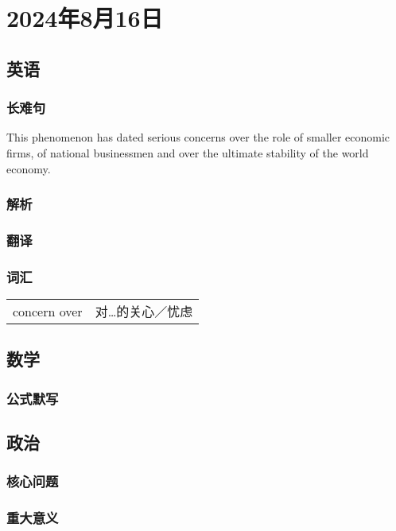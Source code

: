 \documentclass[UTF8]{ctexart}
\begin{document}
\section{2024年8月16日}
\subsection{英语}
\subsubsection{长难句}
This phenomenon has dated serious concerns over the role of smaller economic firms, of national businessmen and over the ultimate stability of the world economy.
\subsubsection{解析}
\subsubsection{翻译}
\subsubsection{词汇}
\begin{table}[h]
      \centering
      \begin{tabular}{p{}p{}}
            concern over & 对…的关心／忧虑
      \end{tabular}
\end{table}
\subsection{数学}
\subsubsection{公式默写}
\begin{multicols}{2}
\end{multicols}
\subsection{政治}
\subsubsection{}
\subsubsection{核心问题}
\subsubsection{重大意义}
\end{document}
